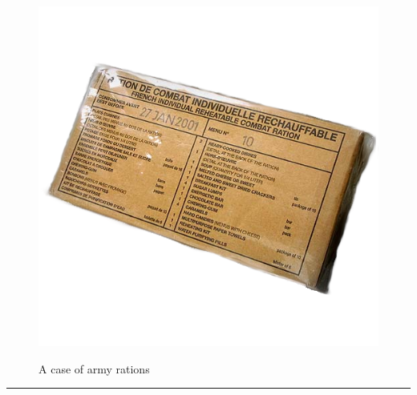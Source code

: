 \documentclass{article}
\begin{document}
    \begin{figure}[H]
        \centering
        \begin{minipage}{0.25\textwidth}
            \centering
            \includegraphics[width=\textwidth]{../SurvivalItemImages/rations}
        \end{minipage}\hfill
        \begin{minipage}{0.7\textwidth}
            \centering
            \Large A case of army rations
        \end{minipage}
    \end{figure}
    \vspace{-0.8em}
    \noindent\rule{\textwidth}{0.4pt}
            
\end{document}
